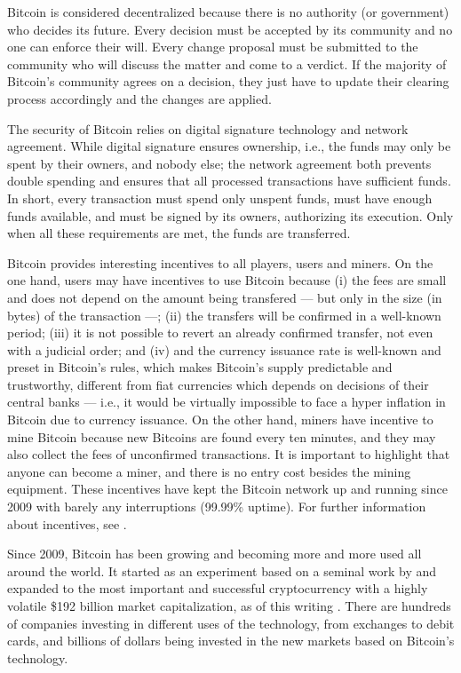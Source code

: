 Bitcoin is considered decentralized because there is no authority (or government) who decides its future. Every decision must be accepted by its community and no one can enforce their will. Every change proposal must be submitted to the community who will discuss the matter and come to a verdict. If the majority of Bitcoin's community agrees on a decision, they just have to update their clearing process accordingly and the changes are applied.

The security of Bitcoin relies on digital signature technology and network agreement. While digital signature ensures ownership, i.e., the funds may only be spent by their owners, and nobody else; the network agreement both prevents double spending and ensures that all processed transactions have sufficient funds. In short, every transaction must spend only unspent funds, must have enough funds available, and must be signed by its owners, authorizing its execution. Only when all these requirements are met, the funds are transferred.

Bitcoin provides interesting incentives to all players, users and miners. On the one hand, users may have incentives to use Bitcoin because (i) the fees are small and does not depend on the amount being transfered --- but only in the size (in bytes) of the transaction ---; (ii) the transfers will be confirmed in a well-known period; (iii) it is not possible to revert an already confirmed transfer, not even with a judicial order; and (iv) and the currency issuance rate is well-known and preset in Bitcoin's rules, which makes Bitcoin's supply predictable and trustworthy, different from fiat currencies which depends on decisions of their central banks --- i.e., it would be virtually impossible to face a hyper inflation in Bitcoin due to currency issuance. On the other hand, miners have incentive to mine Bitcoin because new Bitcoins are found every ten minutes, and they may also collect the fees of unconfirmed transactions. It is important to highlight that anyone can become a miner, and there is no entry cost besides the mining equipment. These incentives have kept the Bitcoin network up and running since 2009 with barely any interruptions (99.99\% uptime). For further information about incentives, see \citet{ma2018market, catalini2016some}.

Since 2009, Bitcoin has been growing and becoming more and more used all around the world. It started as an experiment based on a seminal work by \citet{nakamoto2008bitcoin} and expanded to the most important and successful cryptocurrency with a highly volatile \$192 billion market capitalization, as of this writing \citep{coinmarketcapbtc}. There are hundreds of companies investing in different uses of the technology, from exchanges to debit cards, and billions of dollars being invested in the new markets based on Bitcoin's technology.

